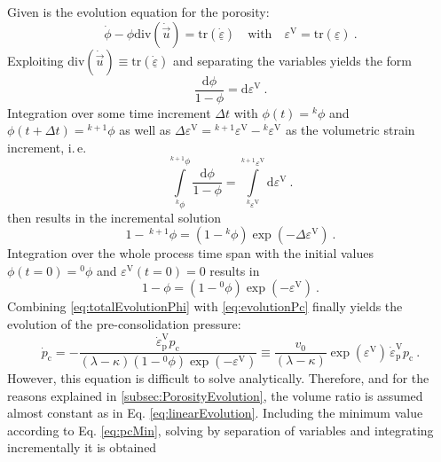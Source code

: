 \documentclass[paper=a4, twoside, pagesize]{scrartcl}
\newcommand{\tensor}[1]{\underline{#1}}
\renewcommand{\c}{\text{c}}
\renewcommand{\d}{\text{d}}
\newcommand{\p}{\text{p}}
\newcommand{\with}{\text{with}}
\newcommand{\trace}{\mathrm{tr}}
\newcommand{\divergence}{\mathrm{div}}
\newcommand{\minus}{-}
\begin{document}
Given is the evolution equation for the porosity:
\begin{equation}
  \dot{\phi} - \phi\divergence(\dot{\vec u}) = \trace(\dot{\tensor\varepsilon}) \quad\with\quad \varepsilon^\text{V} = \trace({\tensor\varepsilon}) \ .
\end{equation}
Exploiting $\divergence(\dot{\vec u})\equiv \trace(\dot{\tensor\varepsilon})$ and separating the variables yields the form
\begin{equation}
  \frac{\d\phi}{1-\phi} = \d\varepsilon^\text{V} \ .
\end{equation}
Integration over some time increment $\varDelta t$ with $\phi(t)={}^{k\!}\phi$ and $\phi(t+\varDelta t)={}^{k+1\!}\phi$ as well as $\Delta\varepsilon^\text{V}={}^{k+1\!}\varepsilon^\text{V}-{}^{k\!}\varepsilon^\text{V}$ as the volumetric strain increment, i.\,e.
\begin{equation}
  \int\limits_{{}^{k\!}\phi}^{{}^{k+1\!}\phi} \frac{\d\phi}{1-\phi} = \int\limits_{{}^{k\!}\varepsilon^\text{V}}^{{}^{k+1\!}\varepsilon^\text{V}} \d\varepsilon^\text{V} \ .
\end{equation}
then results in the incremental solution
\begin{equation}\label{eq:evolutionPhi}
  1 -\, {}^{k+1}\!\phi = (1-{}^{k}\!\phi) \exp(\minus\Delta\varepsilon^\text{V}) \ .
\end{equation}
Integration over the whole process time span with the initial values $\phi(t=0)={}^{0\!}\phi$ and $\varepsilon^\text{V}(t=0)=0$ results in
\begin{equation}\label{eq:totalEvolutionPhi}
  1-\phi = (1-{}^{0}\!\phi) \exp(\minus\varepsilon^\text{V}) \ .
\end{equation}
Combining \eqref{eq:totalEvolutionPhi} with \eqref{eq:evolutionPc} finally yields the evolution of the pre-consolidation pressure:
\begin{equation}
  \dot{p}_\c 
  = -\frac{\dot{\varepsilon}_\p^\text{V} p_\c}{(\lambda - \kappa)(1-{}^{0}\!\phi) \exp(\minus\varepsilon^\text{V})}
  \equiv \frac{v_0}{(\lambda - \kappa)} \exp(\varepsilon^\text{V})\, \dot{\varepsilon}_\p^\text{V} p_\c  \ .
\end{equation}
However, this equation is difficult to solve analytically. Therefore, and for the reasons explained in \autoref{subsec:PorosityEvolution}, the volume ratio is assumed almost constant as in Eq. \eqref{eq:linearEvolution}. Including the minimum value according to Eq. \eqref{eq:pcMin}, solving by separation of variables and integrating incrementally it is obtained
\end{document}
